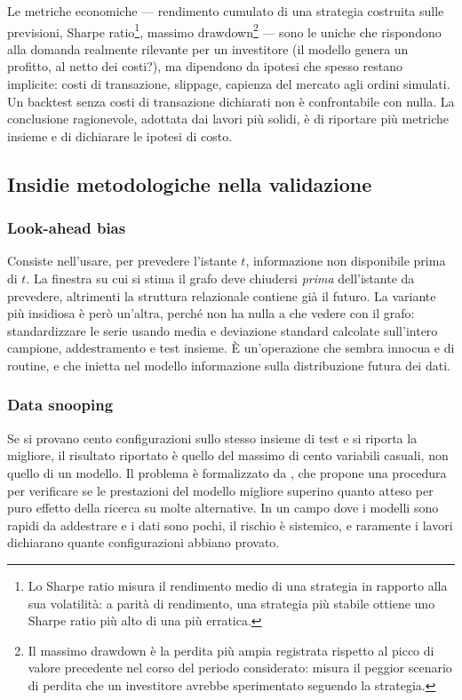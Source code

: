 Le metriche economiche — rendimento cumulato di una strategia costruita sulle previsioni, Sharpe ratio\footnote{Lo Sharpe ratio misura il rendimento medio di una strategia in rapporto alla sua volatilità: a parità di rendimento, una strategia più stabile ottiene uno Sharpe ratio più alto di una più erratica.}, massimo drawdown\footnote{Il massimo drawdown è la perdita più ampia registrata rispetto al picco di valore precedente nel corso del periodo considerato: misura il peggior scenario di perdita che un investitore avrebbe sperimentato seguendo la strategia.} — sono le uniche che rispondono alla domanda realmente rilevante per un investitore (il modello genera un profitto, al netto dei costi?), ma dipendono da ipotesi che spesso restano implicite: costi di transazione, slippage, capienza del mercato agli ordini simulati. Un backtest senza costi di transazione dichiarati non è confrontabile con nulla. La conclusione ragionevole, adottata dai lavori più solidi, è di riportare più metriche insieme e di dichiarare le ipotesi di costo.

\subsection{Insidie metodologiche nella validazione}

\subsubsection{Look-ahead bias}
Consiste nell'usare, per prevedere l'istante $t$, informazione non disponibile prima di $t$. La finestra su cui si stima il grafo deve chiudersi \emph{prima} dell'istante da prevedere, altrimenti la struttura relazionale contiene già il futuro. La variante più insidiosa è però un'altra, perché non ha nulla a che vedere con il grafo: standardizzare le serie usando media e deviazione standard calcolate sull'intero campione, addestramento e test insieme. È un'operazione che sembra innocua e di routine, e che inietta nel modello informazione sulla distribuzione futura dei dati.

\subsubsection{Data snooping}
Se si provano cento configurazioni sullo stesso insieme di test e si riporta la migliore, il risultato riportato è quello del massimo di cento variabili casuali, non quello di un modello. Il problema è formalizzato da \textcite{white2000reality}, che propone una procedura per verificare se le prestazioni del modello migliore superino quanto atteso per puro effetto della ricerca su molte alternative. In un campo dove i modelli sono rapidi da addestrare e i dati sono pochi, il rischio è sistemico, e raramente i lavori dichiarano quante configurazioni abbiano provato.

